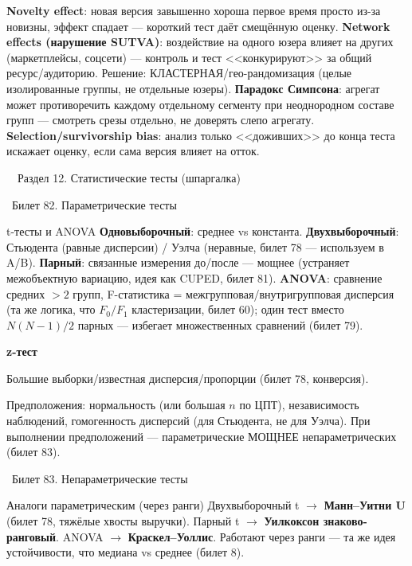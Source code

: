 \documentclass[12pt, a4paper]{article}
\newcommand{\razdel}[2]{%
  \clearpage%
  \noindent\colorbox{razdelcol}{\parbox{\dimexpr\linewidth-2\fboxsep\relax}{%
    \color{white}\LARGE\bfseries\strut\ \ Раздел #1. #2%
  }}%
  \vspace{10pt}%
}
\newcommand{\bilet}[2]{%
  \vspace{10pt}%
  \noindent\colorbox{qcolor}{\parbox{\dimexpr\linewidth-2\fboxsep\relax}{%
    \color{white}\large\bfseries\strut\ Билет #1. #2%
  }}%
  \nopagebreak\vspace{5pt}\par\nopagebreak%
}
\newcommand{\qsub}[1]{%
  \vspace{5pt}%
  {\bfseries\color{defblue} #1}%
  \par\vspace{2pt}%
}
\begin{document}
\begin{fishkabox}
\textbf{Novelty effect}: новая версия завышенно хороша первое время просто из-за новизны, эффект спадает --- короткий тест даёт смещённую оценку.
\textbf{Network effects (нарушение SUTVA)}: воздействие на одного юзера влияет на других (маркетплейсы, соцсети) --- контроль и тест <<конкурируют>> за общий ресурс/аудиторию. Решение: КЛАСТЕРНАЯ/гео-рандомизация (целые изолированные группы, не отдельные юзеры).
\textbf{Парадокс Симпсона}: агрегат может противоречить каждому отдельному сегменту при неоднородном составе групп --- смотреть срезы отдельно, не доверять слепо агрегату.
\textbf{Selection/survivorship bias}: анализ только <<доживших>> до конца теста искажает оценку, если сама версия влияет на отток.
\end{fishkabox}

\vspace{1cm}
\razdel{12}{Статистические тесты (шпаргалка)}

\bilet{82}{Параметрические тесты}

\begin{defbox}{t-тесты и ANOVA}
\textbf{Одновыборочный}: среднее vs константа. \textbf{Двухвыборочный}: Стьюдента (равные дисперсии) / Уэлча (неравные, билет 78 --- используем в A/B). \textbf{Парный}: связанные измерения до/после --- мощнее (устраняет межобъектную вариацию, идея как CUPED, билет 81). \textbf{ANOVA}: сравнение средних $>2$ групп, F-статистика = межгрупповая/внутригрупповая дисперсия (та же логика, что $F_0/F_1$ кластеризации, билет 60); один тест вместо $N(N{-}1)/2$ парных --- избегает множественных сравнений (билет 79).
\end{defbox}

\qsub{z-тест}
Большие выборки/известная дисперсия/пропорции (билет 78, конверсия).

\begin{fishkabox}
Предположения: нормальность (или большая $n$ по ЦПТ), независимость наблюдений, гомогенность дисперсий (для Стьюдента, не для Уэлча). При выполнении предположений --- параметрические МОЩНЕЕ непараметрических (билет 83).
\end{fishkabox}

\bilet{83}{Непараметрические тесты}

\begin{defbox}{Аналоги параметрическим (через ранги)}
Двухвыборочный t $\to$ \textbf{Манн--Уитни U} (билет 78, тяжёлые хвосты выручки). Парный t $\to$ \textbf{Уилкоксон знаково-ранговый}. ANOVA $\to$ \textbf{Краскел--Уоллис}. Работают через ранги --- та же идея устойчивости, что медиана vs среднее (билет 8).
\end{defbox}
\end{document}
